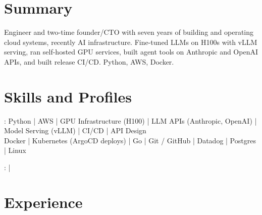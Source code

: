 \documentclass[print]{jack-resume}
\begin{document}
\pagecolor{darkmodeBackground}


\begin{minipage}[t][1cm][t]{.03\textwidth}
    \hfill
\end{minipage}

\section{Summary}
Engineer and two-time founder/CTO with seven years of building and operating cloud systems, recently AI infrastructure. Fine-tuned LLMs on H100s with vLLM serving, ran self-hosted GPU services, built agent tools on Anthropic and OpenAI APIs, and built release CI/CD. Python, AWS, Docker.
\sectionsep

\section{Skills and Profiles}
:
Python \hfill | \hfill
AWS \hfill | \hfill
GPU Infrastructure (H100) \hfill | \hfill
LLM APIs (Anthropic, OpenAI) \hfill | \hfill
Model Serving (vLLM) \hfill | \hfill
CI/CD \hfill | \hfill
API Design \\
\hspace{1.0cm} Docker \hfill | \hfill
Kubernetes (ArgoCD deploys) \hfill | \hfill
Go \hfill | \hfill
Git / GitHub \hfill | \hfill
Datadog \hfill | \hfill
Postgres \hfill | \hfill
Linux \\

\raggedright{
    :
      \href{https://www.linkedin.com/in/jack-sturtevant/}{ \ExternalLink} |
     \href{https://github.com/jacksturt}{ \ExternalLink}}

\section{Experience}
\end{document}
